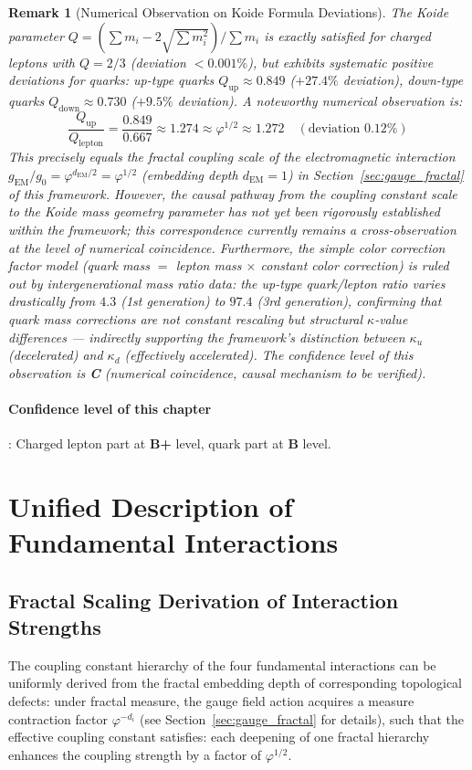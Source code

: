 \documentclass[12pt,a4paper,twocolumn]{article}
\renewcommand{\phi}{\varphi}
\newtheorem{remark}[theorem]{Remark}
\begin{document}
\begin{remark}[Numerical Observation on Koide Formula Deviations]
The Koide parameter $Q = (\sum m_i - 2\sqrt{\sum m_i^2}) / \sum m_i$ is exactly satisfied for charged leptons with $Q = 2/3$ (deviation $<0.001\%$), but exhibits systematic positive deviations for quarks: up-type quarks $Q_{\text{up}} \approx 0.849$ ($+27.4\%$ deviation), down-type quarks $Q_{\text{down}} \approx 0.730$ ($+9.5\%$ deviation). A noteworthy numerical observation is:
\[
\frac{Q_{\text{up}}}{Q_{\text{lepton}}} = \frac{0.849}{0.667} \approx 1.274 \approx \phi^{1/2} \approx 1.272 \quad (\text{deviation } 0.12\%)
\]
This precisely equals the fractal coupling scale of the electromagnetic interaction $g_{\text{EM}}/g_0 = \phi^{d_{\text{EM}}/2} = \phi^{1/2}$ (embedding depth $d_{\text{EM}}=1$) in Section~\ref{sec:gauge_fractal} of this framework. However, the causal pathway from the coupling constant scale to the Koide mass geometry parameter has not yet been rigorously established within the framework; this correspondence currently remains a cross-observation at the level of numerical coincidence. Furthermore, the simple color correction factor model (quark mass $=$ lepton mass $\times$ constant color correction) is ruled out by intergenerational mass ratio data: the up-type quark/lepton ratio varies drastically from $4.3$ (1st generation) to $97.4$ (3rd generation), confirming that quark mass corrections are not constant rescaling but structural $\kappa$-value differences --- indirectly supporting the framework's distinction between $\kappa_u$ (decelerated) and $\kappa_d$ (effectively accelerated). The confidence level of this observation is \textbf{C} (numerical coincidence, causal mechanism to be verified).
\end{remark}

\paragraph{Confidence level of this chapter}: Charged lepton part at \textbf{B+} level, quark part at \textbf{B} level.

\section{Unified Description of Fundamental Interactions}
\label{sec:unified_forces}

\subsection{Fractal Scaling Derivation of Interaction Strengths}
The coupling constant hierarchy of the four fundamental interactions can be uniformly derived from the fractal embedding depth of corresponding topological defects: under fractal measure, the gauge field action acquires a measure contraction factor $\phi^{-d_i}$ (see Section~\ref{sec:gauge_fractal} for details), such that the effective coupling constant satisfies: each deepening of one fractal hierarchy enhances the coupling strength by a factor of $\phi^{1/2}$.
\end{document}
